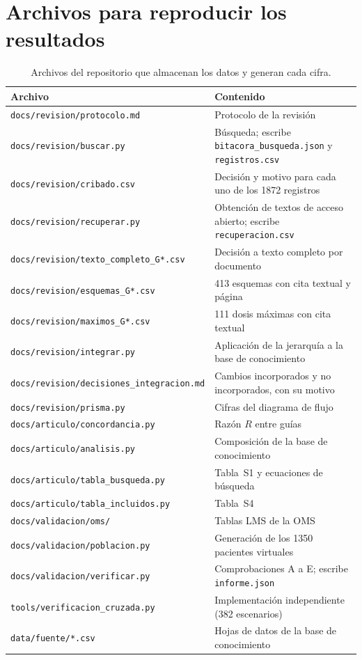 \documentclass[10pt,a4paper]{article}
\newcommand{\archivo}[1]{\texttt{\small #1}}
\begin{document}
\section{Archivos para reproducir los resultados}

\begin{table}[htbp]
\centering
\caption{Archivos del repositorio que almacenan los datos y generan cada cifra.}
\small
\begin{tabularx}{\textwidth}{@{}lX@{}}
\toprule
Archivo & Contenido \\
\midrule
\archivo{docs/revision/protocolo.md} & Protocolo de la revisión \\
\archivo{docs/revision/buscar.py} & Búsqueda; escribe \archivo{bitacora\_busqueda.json} y \archivo{registros.csv} \\
\archivo{docs/revision/cribado.csv} & Decisión y motivo para cada uno de los \num{1872} registros \\
\archivo{docs/revision/recuperar.py} & Obtención de textos de acceso abierto; escribe \archivo{recuperacion.csv} \\
\archivo{docs/revision/texto\_completo\_G*.csv} & Decisión a texto completo por documento \\
\archivo{docs/revision/esquemas\_G*.csv} & 413 esquemas con cita textual y página \\
\archivo{docs/revision/maximos\_G*.csv} & 111 dosis máximas con cita textual \\
\archivo{docs/revision/integrar.py} & Aplicación de la jerarquía a la base de conocimiento \\
\archivo{docs/revision/decisiones\_integracion.md} & Cambios incorporados y no incorporados, con su motivo \\
\archivo{docs/revision/prisma.py} & Cifras del diagrama de flujo \\
\archivo{docs/articulo/concordancia.py} & Razón $R$ entre guías \\
\archivo{docs/articulo/analisis.py} & Composición de la base de conocimiento \\
\archivo{docs/articulo/tabla\_busqueda.py} & Tabla~S1 y ecuaciones de búsqueda \\
\archivo{docs/articulo/tabla\_incluidos.py} & Tabla~S4 \\
\archivo{docs/validacion/oms/} & Tablas LMS de la OMS \\
\archivo{docs/validacion/poblacion.py} & Generación de los \num{1350} pacientes virtuales \\
\archivo{docs/validacion/verificar.py} & Comprobaciones A a E; escribe \archivo{informe.json} \\
\archivo{tools/verificacion\_cruzada.py} & Implementación independiente (382 escenarios) \\
\archivo{data/fuente/*.csv} & Hojas de datos de la base de conocimiento \\
\bottomrule
\end{tabularx}
\end{table}



\end{document}

